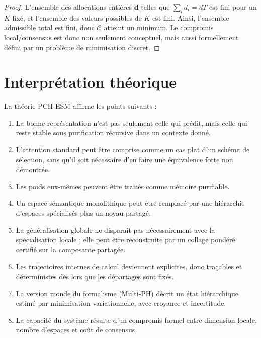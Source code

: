 \documentclass[11pt,a4paper]{article}
\newcommand{\1}{\mathbf 1}
\begin{document}
\begin{proof}
L'ensemble des allocations entières \(\mathbf d\) telles que \(\sum_i d_i=dT\) est fini pour un \(K\) fixé, et l'ensemble des valeurs possibles de \(K\) est fini.  
Ainsi, l'ensemble admissible total est fini, donc \(\mathcal C\) atteint un minimum.  
Le compromis local/consensus est donc non seulement conceptuel, mais aussi formellement défini par un problème de minimisation discret.
\end{proof}



\section{Interprétation théorique}

La théorie PCH-ESM affirme les points suivants :

\begin{enumerate}[leftmargin=2em]
    \item La bonne représentation n'est pas seulement celle qui prédit, mais celle qui reste stable sous purification récursive dans un contexte donné.
    \item L'attention standard peut être comprise comme un cas plat d'un schéma de sélection, sans qu'il soit nécessaire d'en faire une équivalence forte non démontrée.
    \item Les poids eux-mêmes peuvent être traités comme mémoire purifiable.
    \item Un espace sémantique monolithique peut être remplacé par une hiérarchie d'espaces spécialisés plus un noyau partagé.
    \item La généralisation globale ne disparaît pas nécessairement avec la spécialisation locale ; elle peut être reconstruite par un collage pondéré certifié sur la composante partagée.
    \item Les trajectoires internes de calcul deviennent explicites, donc traçables et déterministes dès lors que les départages sont fixés.
    \item La version monde du formalisme (Multi-PH) décrit un état hiérarchique estimé par minimisation variationnelle, avec croyance et incertitude.
    \item La capacité du système résulte d'un compromis formel entre dimension locale, nombre d'espaces et coût de consensus.
\end{enumerate}
\end{document}
